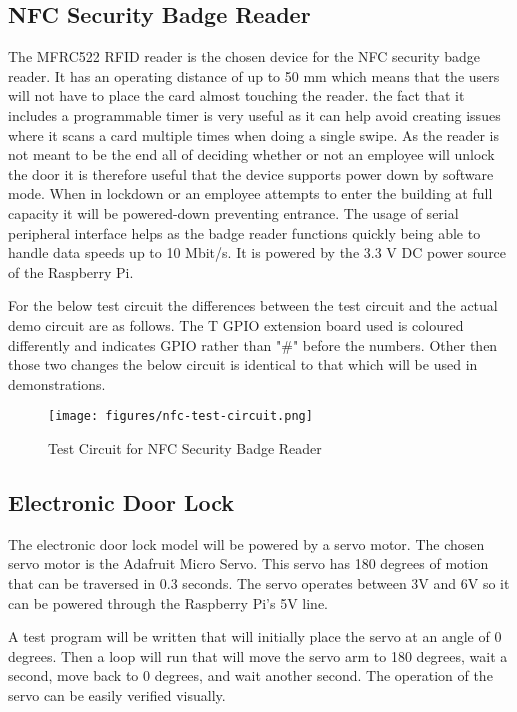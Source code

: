 \subsection{NFC Security Badge Reader}

The MFRC522 RFID reader is the chosen device for the NFC security badge reader. 
It has an operating distance of up to 50 mm which means that the users will not have to place
the card almost touching the reader. the fact that it includes a programmable timer
is very useful as it can help avoid creating issues where it scans a card multiple times 
when doing a single swipe. As the reader is not meant to be the end all of deciding 
whether or not an employee will unlock the door it is therefore useful that the device
supports power down by software mode. When in lockdown or an employee attempts
to enter the building at full capacity it will be powered-down preventing entrance.  
The usage of serial peripheral interface helps as the badge reader functions quickly 
being able to handle data speeds up to 10 Mbit/s. 
It is powered by the 3.3 V DC power source of the Raspberry Pi.


For the below test circuit the differences between the test circuit and the actual demo circuit
are as follows. The T GPIO extension board used is coloured differently
and indicates GPIO rather than "#" before the numbers. 
Other then those two changes the below circuit is identical to that which will be used in demonstrations.

\begin{figure}[!htb]
\centering
\texttt{[image: figures/nfc-test-circuit.png]}
\caption{Test Circuit for NFC Security Badge Reader}
\label{fig:nfc-test-circuit}
\end{figure}

\subsection{Electronic Door Lock}

The electronic door lock model will be powered by a servo motor. The chosen
servo motor is the Adafruit Micro Servo.  This servo has 180 degrees of motion
that can be traversed in 0.3 seconds.  The servo operates between 3V and 6V so
it can be powered through the Raspberry Pi's 5V line.

A test program will be written that will initially place the servo at an angle
of 0 degrees.  Then a loop will run that will move the servo arm to 180 degrees,
wait a second, move back to 0 degrees, and wait another second.  The operation
of the servo can be easily verified visually.

